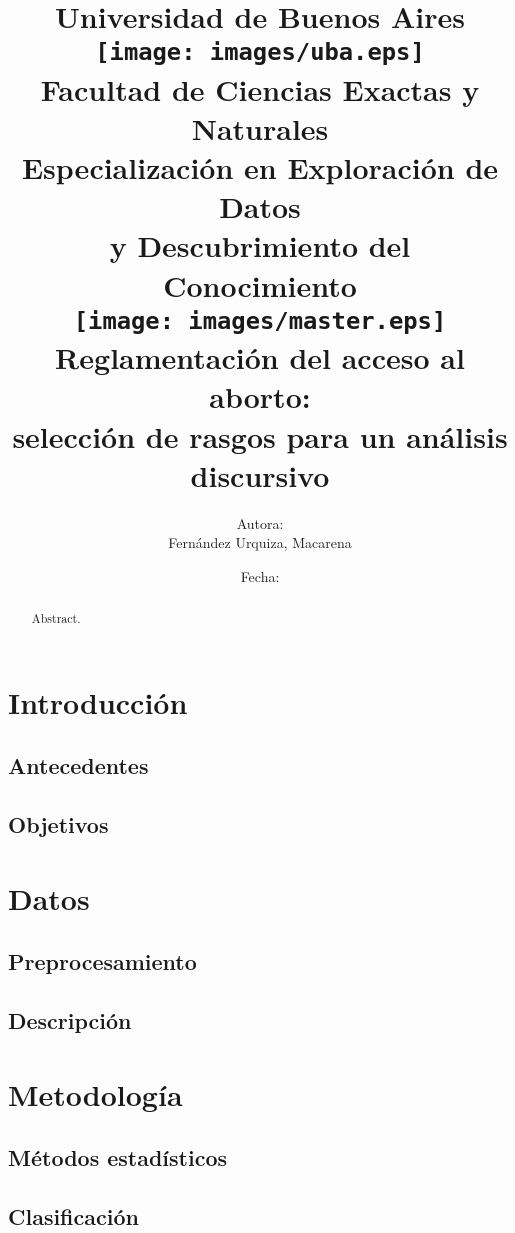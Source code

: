 \documentclass[colorinlistoftodos]{article}
\title{
    {\large Universidad de Buenos Aires\vspace{20pt}}\\
    {\texttt{[image: images/uba.eps]}}\\
    {\large\textbf{Facultad de Ciencias Exactas y Naturales}}\vspace{16pt}\\
    {\small\textbf{Especialización en Exploración de Datos\\y Descubrimiento del Conocimiento}\vspace{16pt}}\\
    {\texttt{[image: images/master.eps]}}\\
    {Reglamentación del acceso al aborto:\\selección de rasgos para un análisis discursivo}
}
\author{Autora:\\Fernández Urquiza, Macarena}
\date{Fecha:\todo{Definir fecha}}
\begin{document}
\clearpage\maketitle
\thispagestyle{empty}

\newpage
\tableofcontents

\newpage

\begin{abstract}
Abstract.
\end{abstract}

\section{Introducción}
\subsection{Antecedentes}

\subsection{Objetivos}


\section{Datos}
\subsection{Preprocesamiento}

\subsection{Descripción}


\section{Metodología}
\subsection{Métodos estadísticos}

\subsection{Clasificación}

\end{document}
